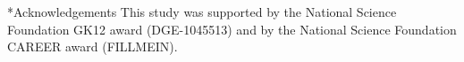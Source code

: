 \documentclass[12pt]{article}
\makeatletter
\renewcommand\section{\@startsection
	{subsection}{2}{0mm}
	{-0.2in}
	{0.05\baselineskip}
	{\normalfont\large\bfseries}}
\makeatother
\begin{document}
\section*{Acknowledgements}
This study was supported by the National Science Foundation GK12 award (DGE-1045513) 
and by the National Science Foundation CAREER award (FILLMEIN).

\clearpage
%
%



\clearpage

\renewcommand\thefigure{S\arabic{figure}}
\renewcommand\thetable{T\arabic{table}}
\renewcommand\thepage{S-\arabic{page}}
\renewcommand\theequation{S\arabic{equation}}

\setcounter{equation}{0}
\setcounter{table}{0}
\setcounter{figure}{0}
\setcounter{page}{1}
\end{document}
